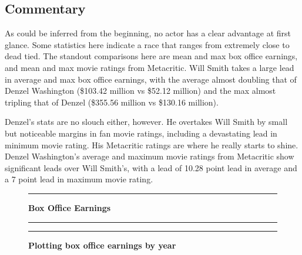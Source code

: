 \documentclass[]{article}
\begin{document}
\newpage

\subsection{Commentary}
\label{sec:summary-commentary}

As could be inferred from the beginning, no actor has a clear advantage
at first glance. Some statistics here indicate a race that ranges from
extremely close to dead tied. The standout comparisons here are mean and
max box office earnings, and mean and max movie ratings from Metacritic.
Will Smith takes a large lead in average and max box office earnings,
with the average almost doubling that of Denzel Washington (\$103.42
million vs \$52.12 million) and the max almost tripling that of Denzel
(\$355.56 million vs \$130.16 million).

\vspace{2.5mm}

Denzel's stats are no slouch either, however. He overtakes Will Smith by
small but noticeable margins in fan movie ratings, including a
devastating lead in minimum movie rating. His Metacritic ratings are
where he really starts to shine. Denzel Washington's average and maximum
movie ratings from Metacritic show significant leads over Will Smith's,
with a lead of 10.28 point lead in average and a 7 point lead in maximum
movie rating.

\newpage

\begin{figure}[!ht]
    \hrule
    \caption{ \textbf{Box Office Earnings} }
    \begin{center}
    \end{center}
    \label{fig:box-office}
  \hrule
  \vspace{2.5mm}
      \caption{\textbf{ Plotting box office earnings by year }   }
      \label{fig:combined}
  \vspace{-2.5mm}
  \hrule
\end{figure}
\end{document}

